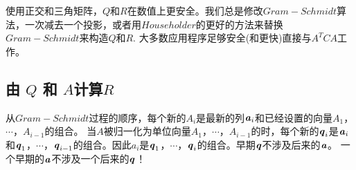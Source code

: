 使用正交和三角矩阵，$Q$和$R$在数值上更安全。我们总是修改$Gram-Schmidt$算法，一次减去一个投影，或者用$Householder$的更好的方法来替换$Gram-Schmidt$来构造$Q$和$R$. 大多数应用程序足够安全(和更快)直接与$A^{T}CA$工作。

\subsection{ 由 $Q$ 和 $A$计算$R$ }

从$Gram-Schmidt$过程的顺序，每个新的$A_{i}$是最新的列$\textbf{\textit{a}}_{i}$和已经设置的向量$A_{1}$，$\cdots$，$A_{i-1}$的组合。 当$A$被归一化为单位向量$A_{1}$，$\cdots$，$A_{i-1}$的时，每个新的$\textbf{\textit{q}}_{i}$是$\textbf{\textit{a}}_{i}$和$\textbf{\textit{q}}_{1}$，$\cdots$，$\textbf{\textit{q}}_{ i-1}$的组合。因此$a_{i}$是$\textbf{\textit{q}}_{1}$，$ \cdots$，$\textbf{\textit{q}}_{i}$的组合。早期$\textbf{\textit{q}}$不涉及后来的$\textbf{\textit{a}}$。 一个早期的$\textbf{\textit{a}}$不涉及一个后来的$ \textbf{\textit{q}}$！

